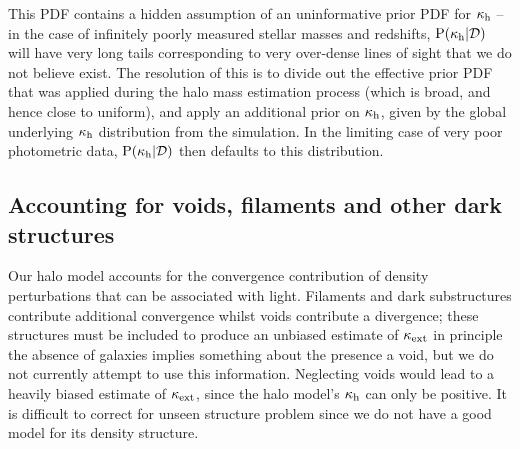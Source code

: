 \documentclass[useAMS,usenatbib]{mn2e}
\begin{document}
This PDF contains a hidden assumption of an uninformative prior PDF for
$\kappa_{\rm h}$ -- in the case of infinitely poorly measured stellar masses and
redshifts, ${\rm P}(\kappa_{\rm h}|{\mathcal{D}})$ will have very long tails corresponding to
very over-dense lines of sight that we do not believe exist. The resolution of this
is to divide out the effective prior PDF that was applied during the halo mass
estimation process (which is broad, and hence close to uniform), and apply an
additional prior on $\kappa_{\rm h}$, given by the global underlying $\kappa_{\rm h}$
distribution from the simulation. In the limiting  case of very poor
photometric data, ${\rm P}(\kappa_{\rm h}|{\mathcal{D}})$ then defaults to this distribution.





\subsection{Accounting for voids, filaments and other dark structures}
\label{sec:model:voids}

Our halo model accounts for the convergence contribution of density perturbations that can
be associated with light. Filaments and dark substructures contribute additional convergence
whilst voids contribute a divergence; these structures must be included to produce an unbiased estimate of $\kappa_{\rm ext}$
in principle the absence of galaxies implies something about
the presence a void, but we do not currently attempt to use this information. Neglecting voids
would lead to a heavily biased estimate of $\kappa_{\rm ext}$, since the halo model's $\kappa_{\rm h}$
can only be positive. It is difficult to correct for unseen structure problem
since we do not have a good model for its density structure.
\end{document}
